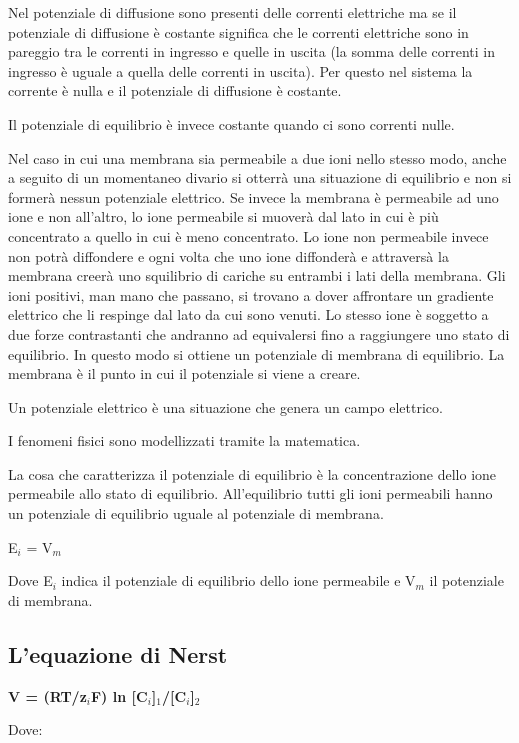 \documentclass[]{article}
\begin{document}
Nel potenziale di diffusione sono presenti delle correnti elettriche ma
se il potenziale di diffusione è costante significa che le correnti
elettriche sono in pareggio tra le correnti in ingresso e quelle in
uscita (la somma delle correnti in ingresso è uguale a quella delle
correnti in uscita). Per questo nel sistema la corrente è nulla e il
potenziale di diffusione è costante.

Il potenziale di equilibrio è invece costante quando ci sono correnti
nulle.

Nel caso in cui una membrana sia permeabile a due ioni nello stesso
modo, anche a seguito di un momentaneo divario si otterrà una situazione
di equilibrio e non si formerà nessun potenziale elettrico. Se invece la
membrana è permeabile ad uno ione e non all'altro, lo ione permeabile si
muoverà dal lato in cui è più concentrato a quello in cui è meno
concentrato. Lo ione non permeabile invece non potrà diffondere e ogni
volta che uno ione diffonderà e attraversà la membrana creerà uno
squilibrio di cariche su entrambi i lati della membrana. Gli ioni
positivi, man mano che passano, si trovano a dover affrontare un
gradiente elettrico che li respinge dal lato da cui sono venuti. Lo
stesso ione è soggetto a due forze contrastanti che andranno ad
equivalersi fino a raggiungere uno stato di equilibrio. In questo modo
si ottiene un potenziale di membrana di equilibrio. La membrana è il
punto in cui il potenziale si viene a creare.

Un potenziale elettrico è una situazione che genera un campo elettrico.

I fenomeni fisici sono modellizzati tramite la matematica.

La cosa che caratterizza il potenziale di equilibrio è la concentrazione
dello ione permeabile allo stato di equilibrio. All'equilibrio tutti gli
ioni permeabili hanno un potenziale di equilibrio uguale al potenziale
di membrana.

E\(_i\) = V\(_m\)

Dove E\(_i\) indica il potenziale di equilibrio dello ione permeabile e
V\(_m\) il potenziale di membrana.

\subsection{L'equazione di Nerst}\label{lequazione-di-nerst}

\textbf{V = (RT/z\(_i\)F) ln {[}C\(_i\){]}\(_1\)/{[}C\(_i\){]}\(_2\)}

Dove:
\end{document}
